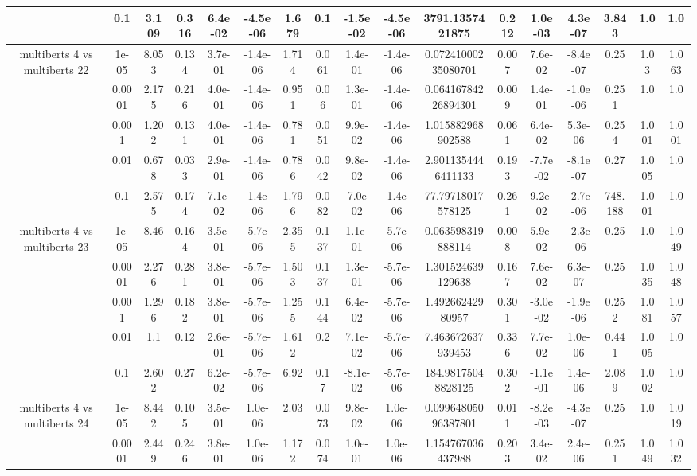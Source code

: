 \begin{tabular}{|c|c|c|c|c|c|c|c|c|c|c|c|c|c|c|c|c|}
 & 0.1 & 3.109 & 0.316 & 6.4e-02 & -4.5e-06 & 1.679 & 0.1 & -1.5e-02 & -4.5e-06 & 3791.1357421875 & 0.212 & 1.0e-03 & 4.3e-07 & 3.843 & 1.0 & 1.0 \\
\hline
\multirow{5}{*}{multiberts 4 vs multiberts 22} & 1e-05 & 8.053 & 0.134 & 3.7e-01 & -1.4e-06 & 1.714 & 0.061 & 1.4e-01 & -1.4e-06 & 0.07241000235080701 & 0.007 & 7.6e-02 & -8.4e-07 & 0.25 & 1.03 & 1.063 \\
 & 0.0001 & 2.175 & 0.216 & 4.0e-01 & -1.4e-06 & 0.951 & 0.06 & 1.3e-01 & -1.4e-06 & 0.06416784226894301 & 0.009 & 1.4e-01 & -1.0e-06 & 0.251 & 1.0 & 1.0 \\
 & 0.001 & 1.202 & 0.131 & 4.0e-01 & -1.4e-06 & 0.781 & 0.051 & 9.9e-02 & -1.4e-06 & 1.015882968902588 & 0.061 & 6.4e-02 & 5.3e-06 & 0.254 & 1.001 & 1.001 \\
 & 0.01 & 0.678 & 0.033 & 2.9e-01 & -1.4e-06 & 0.786 & 0.042 & 9.8e-02 & -1.4e-06 & 2.9011354446411133 & 0.193 & -7.7e-02 & -8.1e-07 & 0.27 & 1.005 & 1.0 \\
 & 0.1 & 2.575 & 0.174 & 7.1e-02 & -1.4e-06 & 1.796 & 0.082 & -7.0e-02 & -1.4e-06 & 77.79718017578125 & 0.261 & 9.2e-02 & -2.7e-06 & 748.188 & 1.001 & 1.0 \\
\hline
\multirow{5}{*}{multiberts 4 vs multiberts 23} & 1e-05 & 8.46 & 0.164 & 3.5e-01 & -5.7e-06 & 2.355 & 0.137 & 1.1e-01 & -5.7e-06 & 0.063598319888114 & 0.008 & 5.9e-02 & -2.3e-06 & 0.25 & 1.0 & 1.049 \\
 & 0.0001 & 2.276 & 0.281 & 3.8e-01 & -5.7e-06 & 1.503 & 0.137 & 1.3e-01 & -5.7e-06 & 1.301524639129638 & 0.167 & 7.6e-02 & 6.3e-07 & 0.25 & 1.035 & 1.048 \\
 & 0.001 & 1.296 & 0.182 & 3.8e-01 & -5.7e-06 & 1.255 & 0.144 & 6.4e-02 & -5.7e-06 & 1.49266242980957 & 0.301 & -3.0e-02 & -1.9e-06 & 0.252 & 1.081 & 1.057 \\
 & 0.01 & 1.1 & 0.12 & 2.6e-01 & -5.7e-06 & 1.612 & 0.2 & 7.1e-02 & -5.7e-06 & 7.463672637939453 & 0.336 & 7.7e-02 & 1.0e-06 & 0.441 & 1.005 & 1.0 \\
 & 0.1 & 2.602 & 0.27 & 6.2e-02 & -5.7e-06 & 6.92 & 0.17 & -8.1e-02 & -5.7e-06 & 184.98175048828125 & 0.302 & -1.1e-01 & 1.4e-06 & 2.089 & 1.002 & 1.0 \\
\hline
\multirow{5}{*}{multiberts 4 vs multiberts 24} & 1e-05 & 8.442 & 0.105 & 3.5e-01 & 1.0e-06 & 2.03 & 0.073 & 9.8e-02 & 1.0e-06 & 0.09964805096387801 & 0.011 & -8.2e-03 & -4.3e-07 & 0.25 & 1.0 & 1.019 \\
 & 0.0001 & 2.449 & 0.246 & 3.8e-01 & 1.0e-06 & 1.172 & 0.074 & 1.0e-01 & 1.0e-06 & 1.154767036437988 & 0.203 & 3.4e-02 & 2.4e-06 & 0.251 & 1.049 & 1.032 \\

\end{tabular}
